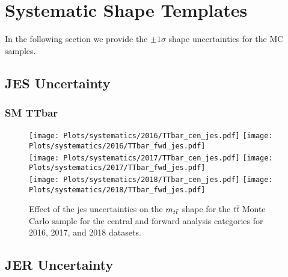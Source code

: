 
\newpage
\section{Systematic Shape Templates}
\label{sec:appendix_syst}

In the following section we provide the  $\pm 1\sigma$ shape uncertainties for the MC samples.
\vspace{-2mm}

\subsection{JES Uncertainty}
 \label{sec:JES_shapes}
 
\vspace{-2mm}

\subsubsection*{SM TTbar}

\vspace{-2mm}

\begin{figure}[!htbp]
\begin{center}
\texttt{[image: Plots/systematics/2016/TTbar\_cen\_jes.pdf]}
\texttt{[image: Plots/systematics/2016/TTbar\_fwd\_jes.pdf]} \\
\texttt{[image: Plots/systematics/2017/TTbar\_cen\_jes.pdf]}
\texttt{[image: Plots/systematics/2017/TTbar\_fwd\_jes.pdf]} \\
\texttt{[image: Plots/systematics/2018/TTbar\_cen\_jes.pdf]}
\texttt{[image: Plots/systematics/2018/TTbar\_fwd\_jes.pdf]} \\
\caption{Effect of the jes uncertainties on the $m_{t\bar{t}}$ shape for the $t\bar{t}$ Monte Carlo sample for the central and forward analysis categories for 2016, 2017, and 2018 datasets.}
\label{fig:syst_jes_tt}
\end{center}
\end{figure}



\newpage






\subsection{JER Uncertainty}
 \label{sec:JER_shapes}
 
